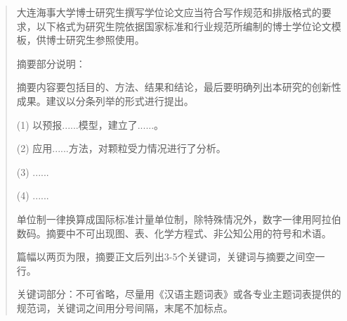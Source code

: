 

\begin{abstract}

大连海事大学博士研究生撰写学位论文应当符合写作规范和排版格式的要求，以下格式为研究生院依据国家标准和行业规范所编制的博士学位论文模板，供博士研究生参照使用。  

摘要部分说明：

摘要内容要包括目的、方法、结果和结论，最后要明确列出本研究的创新性成果。建议以分条列举的形式进行提出。

(1) 以预报......模型，建立了......。 

(2) 应用......方法，对颗粒受力情况进行了分析。

(3) ......

(4) ......

单位制一律换算成国际标准计量单位制，除特殊情况外，数字一律用阿拉伯数码。摘要中不可出现图、表、化学方程式、非公知公用的符号和术语。

篇幅以两页为限，摘要正文后列出3-5个关键词，关键词与摘要之间空一行。

关键词部分：不可省略，尽量用《汉语主题词表》或各专业主题词表提供的规范词，关键词之间用分号间隔，末尾不加标点。


\end{abstract}%
